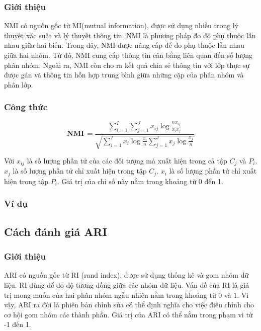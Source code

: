 		\subsubsection{Giới thiệu}
		NMI có nguốn gốc từ MI(mutual information), được sử dụng nhiều trong lý thuyết xác suất và lý thuyết thông tin.
		NMI là phương pháp đo độ phụ thuộc lẫn nhau giữa hai biến.
		Trong đây, NMI được nâng cấp để đo phụ thuộc lẫn nhau giữa hai nhóm.
		Từ đó, NMI cung cấp thông tin cân bằng liên quan đến số lượng phân nhóm.
		Ngoài ra, NMI còn cho ra kết quả chia sẻ thông tin với lớp thực sự được gán và thông tin hỗn hợp trung bình giữa những cặp của phân nhóm và phân lớp.
		
		\subsubsection{Công thức}
		\begin{center}
		\begin{equation}
			\textbf{NMI} \, = \frac{\sum^I_{i=1} \sum^J_{j=1} x_{ij} \log \frac{n x_{ij}}{x_i x_j}}{\sqrt{\sum^I_{i=1} x_i \log \frac{x_i}{n} \sum^J_{j=1} x_j \log \frac{x_j}{n}}}
		\end{equation}
		\end{center}
		
		Với $x_{ij}$ là số lượng phần tử của các đối tượng mà xuất hiện trong cả tập $C_j$ và $P_i$. $x_j$ là số lượng phần tử chỉ xuất hiện trong tập $C_j$. $x_i$ là số lượng phần tử chỉ xuất hiện trong tập $P_i$. Giá trị của chỉ số này nằm trong khoảng từ 0 đến 1.

		\subsubsection{Ví dụ}
		
	\subsection{Cách đánh giá ARI}
		\subsubsection{Giới thiệu}
		ARI có nguồn gốc từ RI (rand index), được sử dụng thống kê và gom nhóm dữ liệu.
		RI dùng để đo độ tương đồng giữa các nhóm dữ liệu.
		Vấn đề của RI là giá trị mong muốn của hai phân nhóm ngẫu nhiên nằm trong khoảng từ $0$ và $1$.
		Vì vậy, ARI ra đời là phiên bản chỉnh sửa có thể định nghĩa cho việc điều chỉnh cho cơ hội gom nhóm các thành phần.
		Giá trị của ARI có thể nằm trong phạm vi từ -1 đến 1.

